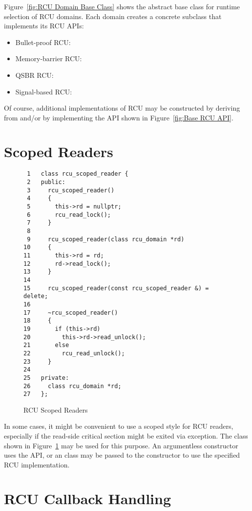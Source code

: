 \documentclass[letterpaper,twocolumn,10pt]{article}
\begin{document}
Figure~\ref{fig:RCU Domain Base Class}
shows the abstract base class for runtime selection of RCU domains.
Each domain creates a concrete subclass that implements its RCU APIs:

\begin{itemize}
\item	Bullet-proof RCU: 
\item	Memory-barrier RCU: 
\item	QSBR RCU: 
\item	Signal-based RCU: 
\end{itemize}

Of course, additional implementations of RCU may be constructed by
deriving from  and/or by implementing the API
shown in
Figure~\ref{fig:Base RCU API}.

\section{Scoped Readers}
\label{sec:Scoped Readers}

\begin{figure}[tbp]
{ \scriptsize
\begin{verbatim}
 1   class rcu_scoped_reader {
 2   public:
 3     rcu_scoped_reader()
 4     {
 5       this->rd = nullptr;
 6       rcu_read_lock();
 7     }
 8
 9     rcu_scoped_reader(class rcu_domain *rd)
10     {
11       this->rd = rd;
12       rd->read_lock();
13     }
14
15     rcu_scoped_reader(const rcu_scoped_reader &) = delete;
16
17     ~rcu_scoped_reader()
18     {
19       if (this->rd)
20         this->rd->read_unlock();
21       else
22         rcu_read_unlock();
23     }
24
25   private:
26     class rcu_domain *rd;
27   };
\end{verbatim}
}
\caption{RCU Scoped Readers}
\label{fig:RCU Scoped Readers}
\end{figure}

In some cases, it might be convenient to use a scoped style for RCU readers,
especially if the read-side critical section might be exited via exception.
The  class shown in
Figure~\ref{fig:RCU Scoped Readers}
may be used for this purpose.
An argumentless constructor uses the API, or an  class
may be passed to the constructor to use the specified RCU
implementation.

\section{RCU Callback Handling}
\label{sec:RCU Callback Handling}
\end{document}
